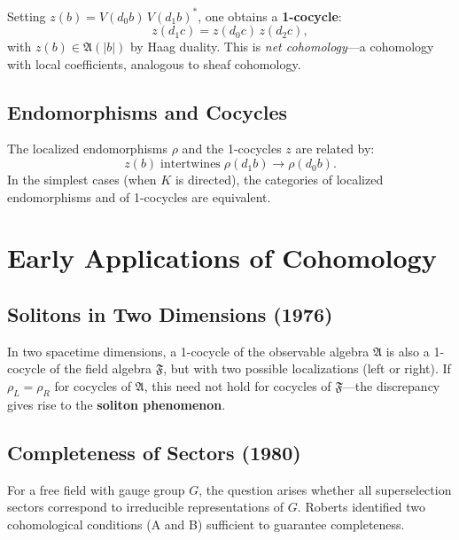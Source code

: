 \documentclass[11pt,a4paper]{article}
\begin{document}
Setting $z(b) = V(d_0 b)\, V(d_1 b)^*$, one obtains a \textbf{1-cocycle}:
\begin{equation}
  z(d_1 c) = z(d_0 c)\, z(d_2 c),
\end{equation}
with $z(b) \in \mathfrak{A}(|b|)$ by Haag duality. This is \emph{net cohomology}---a
cohomology with local coefficients, analogous to sheaf cohomology.

\subsection{Endomorphisms and Cocycles}

The localized endomorphisms $\rho$ and the 1-cocycles $z$ are related by:
\begin{equation}
  z(b) \;\text{intertwines}\; \rho(d_1 b) \to \rho(d_0 b).
\end{equation}
In the simplest cases (when $K$ is directed), the categories of localized
endomorphisms and of 1-cocycles are equivalent.

\section{Early Applications of Cohomology}

\subsection{Solitons in Two Dimensions (1976)}

In two spacetime dimensions, a 1-cocycle of the observable algebra $\mathfrak{A}$
is also a 1-cocycle of the field algebra $\mathfrak{F}$, but with two possible
localizations (left or right). If $\rho_L = \rho_R$ for cocycles of $\mathfrak{A}$,
this need not hold for cocycles of $\mathfrak{F}$---the discrepancy gives rise
to the \textbf{soliton phenomenon}.

\subsection{Completeness of Sectors (1980)}

For a free field with gauge group $G$, the question arises whether all
superselection sectors correspond to irreducible representations of $G$.
Roberts identified two cohomological conditions (A and B) sufficient to
guarantee completeness.
\end{document}
